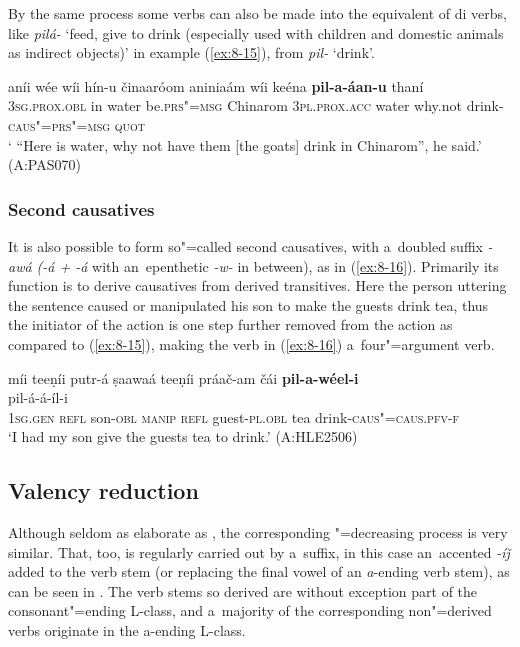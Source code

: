 By the same process some  verbs can also be made into the equivalent of di verbs, like \textit{pilá-} `feed, give to drink (especially used with children and domestic animals as indirect objects)' in example (\ref{ex:8-15}), from \textit{pil-} `drink'. 

\begin{exe}
\ex
\label{ex:8-15}
\gll aníi wée wíi hín-u činaaróom aniniaám wíi keéna \textbf{pil-a-áan-u} thaní  \\
\textsc{3sg.prox.obl} in water be.\textsc{prs"=msg} Chinarom \textsc{3pl.prox.acc} water why.not drink-\textsc{caus"=prs"=msg} \textsc{quot} \\
\glt ` ``Here is water, why not have them [the goats] drink in Chinarom'', he said.' (A:PAS070)
\end{exe}

\subsubsection*{Second causatives}

It is also possible to form so"=called second causatives, with a~doubled  suffix \textit{-awá (-á + -á} with an~epenthetic \textit{-w-} in between), as in (\ref{ex:8-16}). Primarily its function is to derive causatives from derived transitives. Here the person uttering the sentence caused or manipulated his son to make the guests drink tea, thus the initiator of the action is one step further removed from the action as compared to (\ref{ex:8-15}), making the verb in (\ref{ex:8-16}) a~four"=argument verb. 


\ea
\label{ex:8-16}
\glll míi teeṇíi putr-á ṣaawaá teeṇíi práač-am čái \textbf{pil-a-wéel-i}\\
	{} {} {} {} {} {} {}  pil-á-á-íl-i\\
\textsc{1sg.gen} \textsc{refl} son-\textsc{obl} \textsc{manip} \textsc{refl} guest-\textsc{pl.obl} tea drink-\textsc{caus"=caus.pfv-f}\\
\glt `I had my son give the guests tea to drink.' (A:HLE2506)
\z


\subsection{Valency reduction}
\label{subsec:8-5-2}

Although seldom as elaborate as , the corresponding "=decreasing process is very similar. That, too, is regularly carried out by a~suffix, in this case an~accented \textit{-íǰ} added to the verb stem (or replacing the final vowel of an \textit{a}-ending verb stem), as can be seen in . The verb stems so derived are without exception part of the consonant"=ending L-class, and a~majority of the corresponding non"=derived verbs originate in the a-ending L-class.


